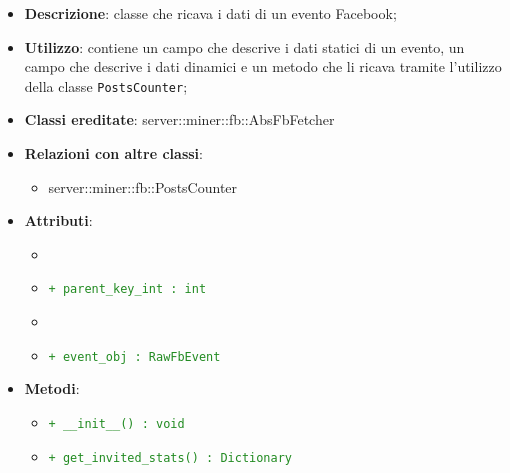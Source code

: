 			\begin{itemize}
				\item \textbf{Descrizione}: classe che ricava i dati di un evento Facebook;
				\item \textbf{Utilizzo}: contiene un campo che descrive i dati statici di un evento, un campo che descrive i dati dinamici e un metodo che li ricava tramite l'utilizzo della classe \texttt{PostsCounter};
				\item \textbf{Classi ereditate}: server::miner::fb::AbsFbFetcher
				\item \textbf{Relazioni con altre classi}:
					\begin{itemize}
						\item server::miner::fb::PostsCounter
					\end{itemize}
				\item \textbf{Attributi}: 
					\begin{itemize}
						\item \item \textcolor{forestgreen}{\texttt{+ parent\_key\_int : int}}
						\item \item \textcolor{forestgreen}{\texttt{+ event\_obj : RawFbEvent}}
					\end{itemize}
				\item \textbf{Metodi}:   
					\begin{itemize}
						\item \textcolor{forestgreen}{\texttt{+ \_\_init\_\_() : void}}
						\item \textcolor{forestgreen}{\texttt{+ get\_invited\_stats() : Dictionary}}

\end{itemize}
\end{itemize}
